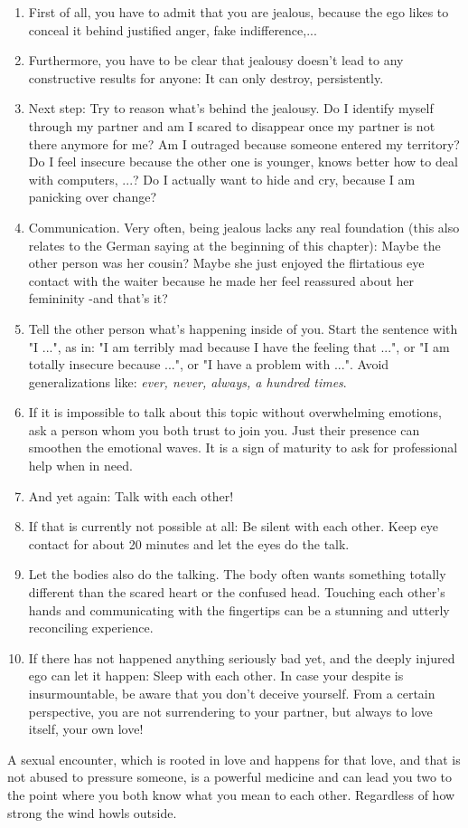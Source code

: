 \begin{enumerate}
\item First of all, you have to admit that you are jealous, because the ego likes to conceal it behind justified anger, fake indifference,...
\item Furthermore, you have to be clear that jealousy doesn't lead to any constructive results for anyone: It can only destroy, persistently.
\item Next step: Try to reason what's behind the jealousy. Do I identify myself through my partner and am I scared to disappear once my partner is not there anymore for me? Am I outraged because someone entered my territory? Do I feel insecure because the other one is younger, knows better how to deal with computers, ...? Do I actually want to hide and cry, because I am panicking over change?
\item Communication. Very often, being jealous lacks any real foundation (this also relates to the German saying at the beginning of this chapter): Maybe the other person was her cousin? Maybe she just enjoyed the flirtatious eye contact with the waiter because he made her feel reassured about  her femininity -and that's it?
\item Tell the other person what's happening inside of you. Start the sentence with "I ...", as in: "I am terribly mad because I have the feeling that ...", or "I am totally insecure because ...", or "I have a problem with ...". Avoid generalizations like: \textit{ever, never, always, a hundred times}.
\item If it is impossible to talk about this topic without overwhelming emotions, ask a person whom you both trust to join you. Just their presence can smoothen the emotional waves. It is a sign of maturity to ask for professional help when in need.
\item And yet again: Talk with each other!
\item If that is currently not possible at all: Be silent with each other. Keep eye contact for about 20 minutes and let the eyes do the talk.
\item Let the bodies also do the talking. The body often wants something totally different than the scared heart or the confused head. Touching each other’s hands and communicating with the fingertips can be a stunning and utterly reconciling experience.
\item If there has not happened anything seriously bad yet, and the deeply injured ego can let it happen: Sleep with each other. In case your despite is insurmountable, be aware that you don't deceive yourself. From a certain perspective, you are not surrendering to your partner, but always to love itself, your own love!
\end{enumerate}

A sexual encounter, which is rooted in love and happens for that love, and that is not abused to pressure someone, is a powerful medicine and can lead you two to the point where you both know what you mean to each other. Regardless of how strong the wind howls outside.
